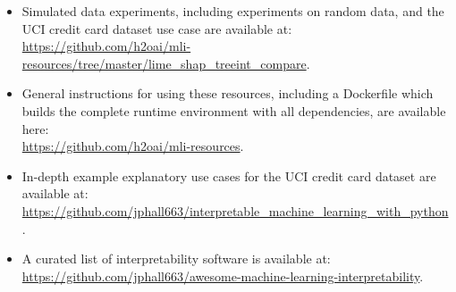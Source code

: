 \documentclass[sigconf, review]{acmart}
\begin{document}
\begin{itemize}

	\item Simulated data experiments, including experiments on random data, and the UCI credit card dataset use case are available at:\\
	
		\url{https://github.com/h2oai/mli-resources/tree/master/lime_shap_treeint_compare}.\\ 
	      
	\item General instructions for using these resources, including a Dockerfile which builds the complete runtime environment with all dependencies, are available here:\\
	      
		\url{https://github.com/h2oai/mli-resources}.\\

	\item In-depth example explanatory use cases for the UCI credit card dataset are available at:\\ 
	
		\url{https://github.com/jphall663/interpretable_machine_learning_with_python}.\\

	\item A curated list of interpretability software is available at:\\
	
		 \url{https://github.com/jphall663/awesome-machine-learning-interpretability}.

\end{itemize}
\end{document}
